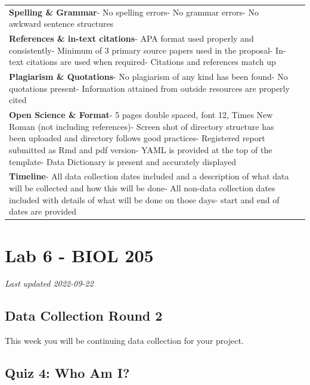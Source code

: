 \documentclass[
]{book}
\begin{document}
\begin{longtable}[]{@{}
  >{\raggedright\arraybackslash}p{}
  >{\raggedright\arraybackslash}p{}@{}}
\textbf{Spelling \& Grammar}- No spelling errors- No grammar errors- No awkward sentence structures & 3 \\
\textbf{References \& in-text citations}- APA format used properly and consistently- Minimum of 3 primary source papers used in the proposal- In-text citations are used when required- Citations and references match up & 4 \\
\textbf{Plagiarism \& Quotations}- No plagiarism of any kind has been found- No quotations present- Information attained from outside resources are properly cited & 3 \\
\textbf{Open Science \& Format}- 5 pages double spaced, font 12, Times New Roman (not including references)- Screen shot of directory structure has been uploaded and directory follows good practices- Registered report submitted as Rmd and pdf version- YAML is provided at the top of the template- Data Dictionary is present and accurately displayed & 4 \\
\textbf{Timeline}- All data collection dates included and a description of what data will be collected and how this will be done- All non-data collection dates included with details of what will be done on those days- start and end of dates are provided & 3 \\
\bottomrule()
\end{longtable}

\hypertarget{part-lab-6---biol-205}{%
\part*{Lab 6 - BIOL 205}\label{part-lab-6---biol-205}}

\emph{Last updated 2022-09-22}

\hypertarget{data-collection-round-2}{%
\chapter*{Data Collection Round 2}\label{data-collection-round-2}}

This week you will be continuing data collection for your project.

\hypertarget{quiz-4-who-am-i}{%
\chapter*{Quiz 4: Who Am I?}\label{quiz-4-who-am-i}}
\end{document}

